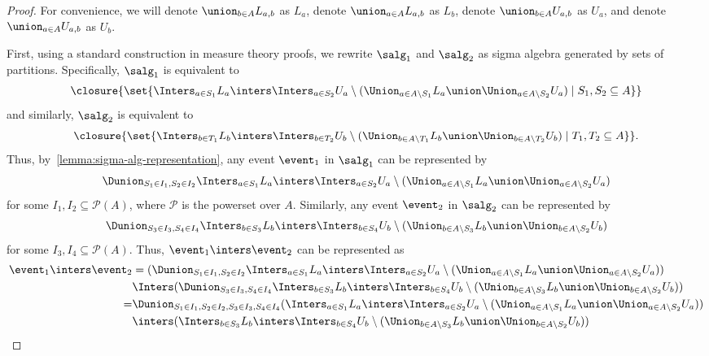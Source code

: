 \begin{proof}
      For convenience, we will
      denote $\union_{b \in A} L_{a, b}$ as $L_a$,
      denote $\union_{a \in A} L_{a, b}$ as $L_b$,
      denote $\union_{b \in A} U_{a, b}$ as $U_a$,
      and denote $\union_{a \in A} U_{a, b}$ as $U_b$.




      First, using a standard construction in measure theory proofs,
      we rewrite $\salg_1$ and $\salg_2$ as sigma algebra generated
      by sets of partitions.
      Specifically, $\salg_1$ is equivalent to
      \[
        \closure{\set{\Inters_{a \in S_1} L_a \inters \Inters_{a \in S_2} U_a \setminus (\Union_{a \in A \setminus S_1} L_a \union \Union_{a \in A \setminus S_2} U_a)  \mid S_1, S_2 \subseteq A}}
      \]
      and similarly, $\salg_2$ is equivalent to
      \[
        \closure{\set{\Inters_{b \in T_1} L_b \inters \Inters_{b \in T_2} U_b \setminus (\Union_{b \in A \setminus T_1} L_b \union \Union_{b \in A \setminus T_2} U_b)  \mid T_1, T_2 \subseteq A}}.
      \]
      Thus, by~\cref{lemma:sigma-alg-representation}, any event $\event_1$ in
      $\salg_1$ can be represented by
      \[
        \Dunion_{S_1 \in I_1, S_2 \in I_2}
        \Inters_{a \in S_1} L_a \inters \Inters_{a \in S_2} U_a \setminus (\Union_{a \in A \setminus S_1} L_a \union \Union_{a \in A \setminus S_2} U_a)
      \]
      for some $I_1, I_2 \subseteq \mathcal{P}(A)$, where
      $\mathcal{P}$ is the powerset over $A$.
      Similarly, any event $\event_2$ in $\salg_2$ can be represented by
      \[
        \Dunion_{S_3 \in I_3, S_4 \in I_4}
        \Inters_{b \in S_3} L_b \inters \Inters_{b \in S_4} U_b \setminus (\Union_{b \in A \setminus S_3} L_b \union \Union_{b \in A \setminus S_2} U_b)
      \]
      for some  $I_3, I_4 \subseteq \mathcal{P}(A)$.
      Thus, $\event_1 \inters \event_2$ can be represented as
      \begin{align*}
        \event_1 \inters \event_2
        &=(\Dunion_{S_1 \in I_1, S_2 \in I_2}
        \Inters_{a \in S_1} L_a \inters \Inters_{a \in S_2} U_a \setminus (\Union_{a \in A \setminus S_1} L_a \union \Union_{a \in A \setminus S_2} U_a) ) \\
        &\Inters
        (\Dunion_{S_3 \in I_3, S_4 \in I_4}
        \Inters_{b \in S_3} L_b \inters \Inters_{b \in S_4} U_b \setminus (\Union_{b \in A \setminus S_3} L_b \union \Union_{b \in A \setminus S_2} U_b) )\\
        = & \Dunion_{S_1 \in I_1, S_2 \in I_2, S_3 \in I_3, S_4 \in I_4} (\Inters_{a \in S_1} L_a \inters \Inters_{a \in S_2} U_a \setminus (\Union_{a \in A \setminus S_1} L_a \union \Union_{a \in A \setminus S_2} U_a) ) \\
          &\inters ( \Inters_{b \in S_3} L_b \inters \Inters_{b \in S_4} U_b \setminus (\Union_{b \in A \setminus S_3} L_b \union \Union_{b \in A \setminus S_2} U_b) )
      \end{align*}


\end{proof}
